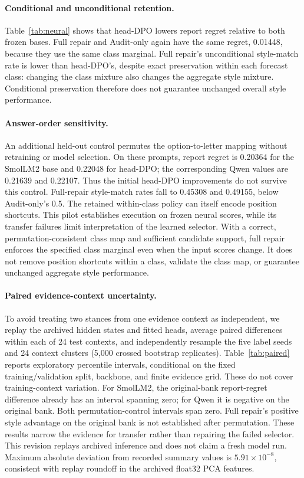 \documentclass[10pt]{article}
\begin{document}
\paragraph{Conditional and unconditional retention.}
Table~\ref{tab:neural} shows that head-DPO lowers report regret relative
to both frozen bases. Full repair and Audit-only again have the same
regret, 0.01448, because they use the same class marginal. Full repair's
unconditional style-match rate is lower than head-DPO's, despite exact
preservation within each forecast class: changing the class mixture also
changes the aggregate style mixture. Conditional preservation therefore
does not guarantee unchanged overall style performance.

\paragraph{Answer-order sensitivity.}
An additional held-out control permutes the option-to-letter mapping
without retraining or model selection. On these prompts, report regret
is 0.20364 for the SmolLM2 base and 0.22048 for head-DPO; the corresponding
Qwen values are 0.21639 and 0.22107. Thus the initial head-DPO improvements
do not survive this control. Full-repair style-match rates fall to 0.45308
and 0.49155, below Audit-only's 0.5. The retained within-class policy can
itself encode position shortcuts. This pilot establishes execution on
frozen neural scores, while its transfer failures limit interpretation
of the learned selector.
With a correct, permutation-consistent class map and sufficient candidate
support, full repair enforces the specified class marginal even when the
input scores change. It does not remove position shortcuts within a class,
validate the class map, or guarantee unchanged aggregate style performance.


\paragraph{Paired evidence-context uncertainty.}
To avoid treating two stances from one evidence context as independent,
we replay the archived hidden states and fitted heads, average paired
differences within each of 24 test contexts, and independently resample
the five label seeds and 24 context clusters (5,000 crossed bootstrap
replicates). Table~\ref{tab:paired} reports exploratory percentile intervals,
conditional on the fixed training/validation split, backbone, and finite
evidence grid. These do not cover training-context variation. For SmolLM2,
the original-bank report-regret difference already has an interval spanning
zero; for Qwen it is negative on the original bank. Both permutation-control
intervals span zero. Full repair's positive style advantage on the original
bank is not established after permutation. These results narrow the evidence
for transfer rather than repairing the failed selector. This revision
replays archived inference and does not claim a fresh model run. Maximum
absolute deviation from recorded summary values is $5.91\times10^{-8}$,
consistent with replay roundoff in the archived float32 PCA features.
\end{document}
